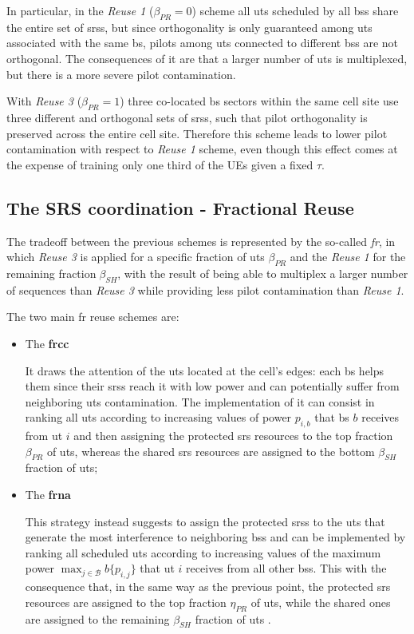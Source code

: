 \documentclass[11pt]{book}
\begin{document}
In particular, in the \textit{Reuse 1} ($\beta_{PR} = 0$) scheme all \gls{ut}s scheduled by all \gls{bs}s share the entire set of \gls{srs}s, but since orthogonality is only guaranteed among \gls{ut}s associated with the same \gls{bs}, pilots among \gls{ut}s connected to different \gls{bs}s are not orthogonal. The consequences of it are that a larger number of \gls{ut}s is multiplexed, but there is a more severe
pilot contamination.

With \textit{Reuse 3} ($\beta_{PR} = 1$) three co-located \gls{bs} sectors within the same cell site use three different and orthogonal sets of \gls{srs}s, such that pilot orthogonality is preserved across the entire cell site. Therefore this scheme leads to lower pilot contamination with respect to \textit{Reuse 1} scheme, even though this effect comes at the expense of training only one third of the UEs given a fixed $\tau$.

\subsection{The SRS coordination - Fractional Reuse}
The tradeoff between the previous schemes is represented by the so-called \textit{\gls{fr}}, in which \textit{Reuse 3} is applied for a specific fraction of \gls{ut}s $\beta_{PR}$ and the \textit{Reuse 1} for the remaining fraction$\beta_{SH}$, with the result of being able to multiplex a larger number of sequences than \textit{Reuse 3} while providing less pilot contamination than \textit{Reuse 1}.

The two main \gls{fr} reuse schemes are:
\begin{itemize}
  \item The \textbf{\gls{frcc}}

   It draws the attention of the \gls{ut}s located at the cell's edges: each \gls{bs} helps them since their \gls{srs}s reach it with low power and can potentially suffer from neighboring \gls{ut}s contamination. The implementation of it can consist in ranking all \gls{ut}s according to increasing values of power $p_{i,b}$ that \gls{bs} $b$ receives from \gls{ut} $i$ and then assigning the protected \gls{srs} resources to the top fraction $\beta_{PR}$ of \gls{ut}s, whereas the shared \gls{srs} resources are assigned to the bottom $\beta_{SH}$ fraction of \gls{ut}s;

  \item The \textbf{\gls{frna}}

  This strategy instead suggests to assign the protected \gls{srs}s to the \gls{ut}s that generate the most interference to neighboring \gls{bs}s and can be implemented by ranking all scheduled \gls{ut}s according to increasing values of the maximum power $\max_{j\in\mathcal{B}}b\{p_{i,j}\}$ that \gls{ut} $i$ receives from all other \gls{bs}s. This with the consequence that, in the same way as the previous point, the protected \gls{srs} resources are assigned to the top fraction $\eta_{PR}$ of \gls{ut}s, while the shared ones are assigned to the remaining $\beta_{SH}$ fraction of \gls{ut}s \cite{Giordano}.
\end{itemize}



\end{document}
